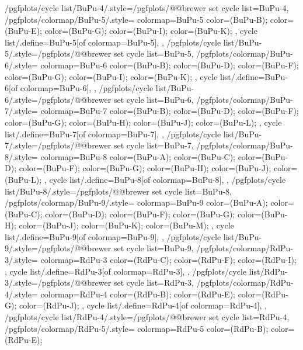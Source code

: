{  /pgfplots/cycle list/BuPu-4/.style={/pgfplots/@@brewer set cycle list={BuPu-4}},
  /pgfplots/colormap/BuPu-5/.style={
    colormap={BuPu-5}{
      color=(BuPu-B);
      color=(BuPu-E);
      color=(BuPu-G);
      color=(BuPu-I);
      color=(BuPu-K);
    },
    cycle list/.define={BuPu-5}{[of colormap=BuPu-5]},
  },
  /pgfplots/cycle list/BuPu-5/.style={/pgfplots/@@brewer set cycle list={BuPu-5}},
  /pgfplots/colormap/BuPu-6/.style={
    colormap={BuPu-6}{
      color=(BuPu-B);
      color=(BuPu-D);
      color=(BuPu-F);
      color=(BuPu-G);
      color=(BuPu-I);
      color=(BuPu-K);
    },
    cycle list/.define={BuPu-6}{[of colormap=BuPu-6]},
  },
  /pgfplots/cycle list/BuPu-6/.style={/pgfplots/@@brewer set cycle list={BuPu-6}},
  /pgfplots/colormap/BuPu-7/.style={
    colormap={BuPu-7}{
      color=(BuPu-B);
      color=(BuPu-D);
      color=(BuPu-F);
      color=(BuPu-G);
      color=(BuPu-H);
      color=(BuPu-J);
      color=(BuPu-L);
    },
    cycle list/.define={BuPu-7}{[of colormap=BuPu-7]},
  },
  /pgfplots/cycle list/BuPu-7/.style={/pgfplots/@@brewer set cycle list={BuPu-7}},
  /pgfplots/colormap/BuPu-8/.style={
    colormap={BuPu-8}{
      color=(BuPu-A);
      color=(BuPu-C);
      color=(BuPu-D);
      color=(BuPu-F);
      color=(BuPu-G);
      color=(BuPu-H);
      color=(BuPu-J);
      color=(BuPu-L);
    },
    cycle list/.define={BuPu-8}{[of colormap=BuPu-8]},
  },
  /pgfplots/cycle list/BuPu-8/.style={/pgfplots/@@brewer set cycle list={BuPu-8}},
  /pgfplots/colormap/BuPu-9/.style={
    colormap={BuPu-9}{
      color=(BuPu-A);
      color=(BuPu-C);
      color=(BuPu-D);
      color=(BuPu-F);
      color=(BuPu-G);
      color=(BuPu-H);
      color=(BuPu-J);
      color=(BuPu-K);
      color=(BuPu-M);
    },
    cycle list/.define={BuPu-9}{[of colormap=BuPu-9]},
  },
  /pgfplots/cycle list/BuPu-9/.style={/pgfplots/@@brewer set cycle list={BuPu-9}},
  /pgfplots/colormap/RdPu-3/.style={
    colormap={RdPu-3}{
      color=(RdPu-C);
      color=(RdPu-F);
      color=(RdPu-I);
    },
    cycle list/.define={RdPu-3}{[of colormap=RdPu-3]},
  },
  /pgfplots/cycle list/RdPu-3/.style={/pgfplots/@@brewer set cycle list={RdPu-3}},
  /pgfplots/colormap/RdPu-4/.style={
    colormap={RdPu-4}{
      color=(RdPu-B);
      color=(RdPu-E);
      color=(RdPu-G);
      color=(RdPu-J);
    },
    cycle list/.define={RdPu-4}{[of colormap=RdPu-4]},
  },
  /pgfplots/cycle list/RdPu-4/.style={/pgfplots/@@brewer set cycle list={RdPu-4}},
  /pgfplots/colormap/RdPu-5/.style={
    colormap={RdPu-5}{
      color=(RdPu-B);
      color=(RdPu-E);
}}}
